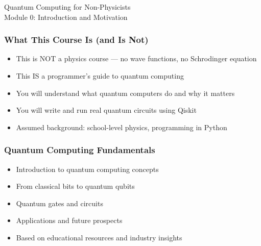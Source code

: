 
\begin{frame}[fragile]\frametitle{}
\begin{center}
{\Large Quantum Computing for Non-Physicists}\\[0.5em]
{\large Module 0: Introduction and Motivation}
\end{center}
\end{frame}

\begin{frame}[fragile]\frametitle{What This Course Is (and Is Not)}
\begin{itemize}
\item This is NOT a physics course --- no wave functions, no Schrodinger equation
\item This IS a programmer's guide to quantum computing
\item You will understand what quantum computers do and why it matters
\item You will write and run real quantum circuits using Qiskit
\item Assumed background: school-level physics, programming in Python
\end{itemize}
\end{frame}

\begin{frame}[fragile]\frametitle{Quantum Computing Fundamentals}
\begin{itemize}
\item Introduction to quantum computing concepts
\item From classical bits to quantum qubits
\item Quantum gates and circuits
\item Applications and future prospects
\item Based on educational resources and industry insights
\end{itemize}
\end{frame}

